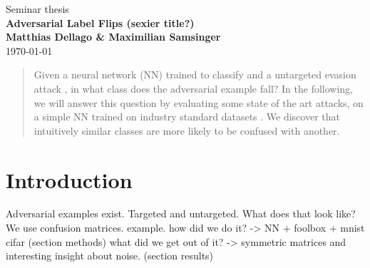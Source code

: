 \documentclass{article}
\begin{document}
\begin{titlepage}
	\noindent{}
	\vspace{3cm}
	\begin{center}
		{\Large Seminar thesis}
		\vspace{50pt}\\
		\textbf{\Huge Adversarial Label Flips (sexier title?)}
		\vspace{40pt}\\
		\textbf{\Large Matthias Dellago \& Maximilian Samsinger}\vspace{20pt}\\
		{\large\today}
		\vspace{120pt}
	\end{center}
\end{titlepage}
	
	\DeclarePairedDelimiter\abs{\lvert}{\rvert}%
	\DeclarePairedDelimiter\norm{\lVert}{\rVert}%
	\DeclarePairedDelimiter\ceil{\lceil}{\rceil}
	\DeclarePairedDelimiter\floor{\lfloor}{\rfloor}
	
\begin{abstract}
	
	Given a neural network (NN) trained to classify and a untargeted evasion attack \cite{}, in what class does the adversarial example fall?
	In the following, we will answer this question by evaluating some state of the art attacks, on a simple NN trained on industry standard datasets \cite{mnist, fashion,mnist, cifar10}.
	We discover that intuitively similar classes are more likely to be confused with another.
\end{abstract}

\section{Introduction}

Adversarial examples exist.
Targeted and untargeted.
What does that look like?
We use confusion matrices.
example.
how did we do it? -> NN + foolbox + mnist cifar (section methods)
what did we get out of it? -> symmetric matrices and interesting insight about noise. (section results)
\end{document}
